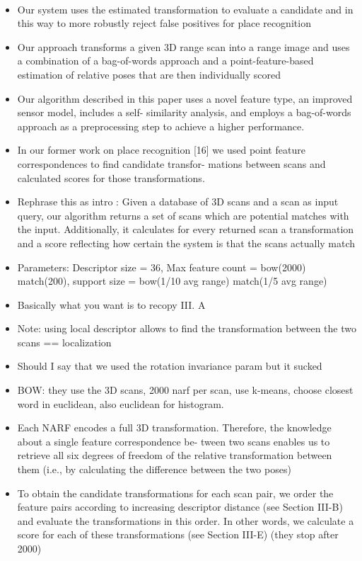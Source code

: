 ~\citep[Section III, A]{Steder2011b}
\begin{itemize}
    \item Our system uses the estimated transformation to evaluate a candidate and in this way to more robustly reject false positives for place recognition
    \item Our approach transforms a given 3D range scan into a range image and uses a combination of a bag-of-words approach and a point-feature-based estimation of relative poses that are then individually scored
    \item Our algorithm described in this paper uses a novel feature type, an improved sensor model, includes a self- similarity analysis, and employs a bag-of-words approach as a preprocessing step to achieve a higher performance.
    \item In our former work on place recognition [16] we used point feature correspondences to find candidate transfor- mations between scans and calculated scores for those transformations.
    \item Rephrase this as intro : Given a database of 3D scans and a scan as input query, our algorithm returns a set of scans which are potential matches with the input. Additionally, it calculates for every returned scan a transformation and a score reflecting how certain the system is that the scans actually match
    \item Parameters: Descriptor size = 36, Max feature count = bow(2000) match(200), support size = bow(1/10 avg range) match(1/5 avg range)
    \item Basically what you want is to recopy III. A
    \item Note: using local descriptor allows to find the transformation between the two scans == localization
    \item Should I say that we used the rotation invariance param but it sucked
    \item BOW: they use the 3D scans, 2000 narf per scan, use k-means, choose closest word in euclidean, also euclidean for histogram.
    \item Each NARF encodes a full 3D transformation. Therefore, the knowledge about a single feature correspondence be- tween two scans enables us to retrieve all six degrees of freedom of the relative transformation between them (i.e., by calculating the difference between the two poses)
    \item To obtain the candidate transformations for each scan pair, we order the feature pairs according to increasing descriptor distance (see Section III-B) and evaluate the transformations in this order. In other words, we calculate a score for each of these transformations (see Section III-E) (they stop after 2000)

\end{itemize}
